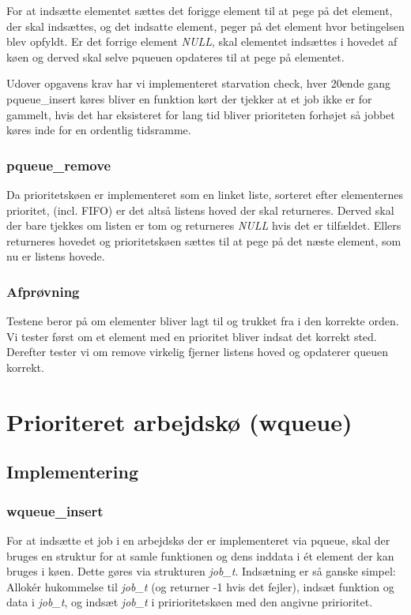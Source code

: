\documentclass[titlepage]{article}
\begin{document}
      For at indsætte elementet sættes det forigge element til at pege på det element, der skal indsættes, og det indsatte element, peger på det element hvor betingelsen blev opfyldt.
      Er det forrige element {\it NULL}, skal elementet indsættes i hovedet af køen og derved skal selve pqueuen opdateres til at pege på elementet.

      Udover opgavens krav har vi implementeret starvation check, hver 20ende gang pqueue\_insert køres bliver en funktion kørt der tjekker at et job ikke er for gammelt, hvis det har eksisteret for lang tid bliver prioriteten forhøjet så jobbet køres inde for en ordentlig tidsramme.

    \subsubsection{pqueue\_remove}
      Da prioritetskøen er implementeret som en linket liste, sorteret efter elementernes prioritet, (incl. FIFO) er det altså listens hoved der skal returneres.
      Derved skal der bare tjekkes om listen er tom og returneres {\it NULL} hvis det er tilfældet.
      Ellers returneres hovedet og prioritetskøen sættes til at pege på det næste element, som nu er listens hovede.
    \subsubsection{Afprøvning}
     Testene beror på om elementer bliver lagt til og trukket fra i den korrekte orden. Vi tester først om et element med en prioritet bliver indsat det korrekt sted. Derefter tester vi om remove virkelig fjerner listens hoved og opdaterer queuen korrekt.

\section{Prioriteret arbejdskø (wqueue)}
  \subsection{Implementering}
    \subsubsection{wqueue\_insert}
      For at indsætte et job i en arbejdskø der er implementeret via pqueue, skal der bruges en struktur for at samle funktionen og dens inddata i ét element der kan bruges i køen.
      Dette gøres via strukturen {\it job\_t}.
      Indsætning er så ganske simpel:
      Allokér hukommelse til {\it job\_t} (og returner -1 hvis det fejler), indsæt funktion og data i {\it job\_t}, og indsæt {\it job\_t} i pririoritetskøen med den angivne pririoritet.
\end{document}
